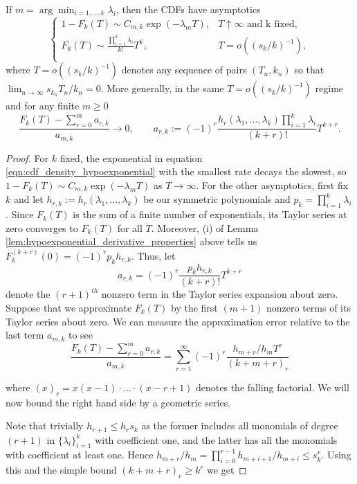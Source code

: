 \begin{subappendices}
\begin{theorem}
    If $m = \arg \min_{i=1,...,k} \lambda_i$, then the CDFs have asymptotics
        \[\begin{cases}
            1-F_k(T)  \sim   C_{m,k}\exp(-\lambda_m T), & T \uparrow \infty \text{ and k fixed,}\\
            F_k(T)  \sim \frac{\prod_{i=1}^k \lambda_i}{k!} T^{k}, &  T = o((s_{k}/k)^{-1}),\\
        \end{cases}\]
        \noindent where $T = o((s_k/k)^{-1})$ denotes any sequence of pairs $(T_n, k_n)$ so that $\lim_{n \to \infty} s_{k_n}T_n/k_n = 0$. More generally, in the same $T = o((s_k/k)^{-1})$ regime and for any finite $m \geq 0$
        \[\frac{F_k(T) - \sum_{r=0}^{m} a_{r,k}}{a_{m, k}} \to 0, \qquad a_{r,k} := (-1)^r \frac{h_{r}(\lambda_1,..., \lambda_k)\prod_{i=1}^k \lambda_i }{(k+r)!} T^{k+r}.\]
\end{theorem}


\begin{proof}
 For $k$ fixed, the exponential in equation \ref{eqn:cdf_density_hypoexponential} with the smallest rate decays the slowest, so $1-F_k(T) \sim C_{m,k}\exp(-\lambda_m T)$ as $T \to \infty$. For the other asymptotics, first fix $k$ and let $h_{r,k} := h_r(\lambda_1, ..., \lambda_k)$ be our symmetric polynomials and $p_k = \prod_{i=1}^k \lambda_i$. Since $F_k(T)$ is the sum of a finite number of exponentials, its Taylor series at zero converges to $F_k(T)$ for all $T$. Moreover, (i) of Lemma \ref{lem:hypoexponential_derivative_properties} above tells us $F_k^{(k+r)}(0) = (-1)^r p_k h_{r,k}$. Thus, let
%
\[a_{r,k} = (-1)^r \frac{p_k h_{r,k}}{(k+r)!} T^{k+r}\]
%
\noindent denote the $(r+1)^{th}$ nonzero term in the Taylor series expansion about zero. Suppose that we approximate $F_k(T)$ by the first $(m+1)$ nonzero terms of its Taylor series about zero. We can measure the approximation error relative to the last term $a_{m,k}$ to see
%
\[\frac{F_k(T) - \sum_{r=0}^{m} a_{r,k}}{a_{m, k}} = \sum_{r=1}^\infty (-1)^r\frac{h_{m+r}/h_mT^r}{(k+m+r)_r}\]

\noindent where $(x)_r = x(x-1) \cdot ... \cdot (x-r+1)$ denotes the falling factorial. We will now bound the right hand side by a geometric series.

Note that trivially $h_{r+1} \leq h_r s_k$ as the former includes all monomials of degree $(r+1)$ in $\{\lambda_i\}_{i=1}^k$ with coefficient one, and the latter has all the monomials with coefficient at least one. Hence $h_{m+r} / h_m = \prod_{i=0}^{r-1} h_{m+i+1}/h_{m+i} \leq s_k^r$. Using this and the simple bound $(k + m + r)_r \geq k^r$ we get


\end{proof}
\end{subappendices}
